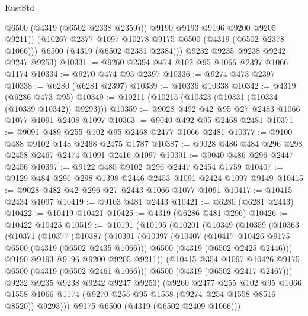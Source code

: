 \begin{lexlean}{RustStd}
\begin{coremodule}
              @6500
              (@4319 (@6502 @2338 @2359)))
            @9190
            @9193
            @9196
            @9200
            @9205
            @9211))
        (@10267 @2377 @1097 @10278 @9175 @6500 (@4319 (@6502 @2378 @1066)))
        @6500
        (@4319 (@6502 @2331 @2384)))
      @9232
      @9235
      @9238
      @9242
      @9247
      @9253)
@10331 := @9260 @2394 @474 @102 @95 @1066 @2397 @1066 @1174
@10334 := @9270 @474 @95 @2397
@10336 := @9274 @473 @2397
@10338 := @6280 (@6281 @2397)
@10339 := @10336 @10338
@10342 := @4319 (@6286 @473 @95)
@10349 := @10211 (@10215 (@10323 (@10331 (@10334 (@10339 @10342)) @9293)))
@10359 := @9028 @492 @42 @95 @27 @2483 @1066 @1077 @1091 @2408 @1097
@10363 := @9040 @492 @95 @2468 @2481
@10371 := @9091 @489 @255 @102 @95 @2468 @2477 @1066 @2481
@10377 := @9100 @488 @9102 @148 @2468 @2475 @1787
@10387 := @9028 @486 @484 @296 @298 @2458 @2467 @2474 @1091 @2416 @1097
@10391 := @9040 @486 @296 @2447 @2456
@10397 := @9122 @485 @9102 @296 @2447 @2454 @1759
@10407 := @9129 @484 @296 @298 @1398 @2446 @2453 @1091 @2424 @1097 @9149
@10415 := @9028 @482 @42 @296 @27 @2443 @1066 @1077 @1091
@10417 := @10415 @2434 @1097
@10419 := @9163 @481 @2443
@10421 := @6280 (@6281 @2443)
@10422 := @10419 @10421
@10425 := @4319 (@6286 @481 @296)
@10426 := @10422 @10425
@10519 := @10191
    (@10195
      (@10201
        (@10349
          (@10359
            (@10363
              (@10371
                (@10377
                  (@10387
                    (@10391
                      (@10397
                        (@10407
                          (@10417 @10426 @9175 @6500 (@4319 (@6502 @2435 @1066)))
                          @6500
                          (@4319 (@6502 @2425 @2446)))
                        @9190
                        @9193
                        @9196
                        @9200
                        @9205
                        @9211))
                    (@10415 @354 @1097 @10426 @9175 @6500 (@4319 (@6502 @2461 @1066)))
                    @6500
                    (@4319 (@6502 @2417 @2467)))
                  @9232
                  @9235
                  @9238
                  @9242
                  @9247
                  @9253)
                (@9260
                  @2477
                  @255
                  @102
                  @95
                  @1066
                  @1558
                  @1066
                  @1174
                  (@9270 @255 @95 @1558 (@9274 @254 @1558 @8516 @8520))
                  @9293)))
            @9175
            @6500
            (@4319 (@6502 @2409 @1066)))

\end{coremodule}
\end{lexlean}
